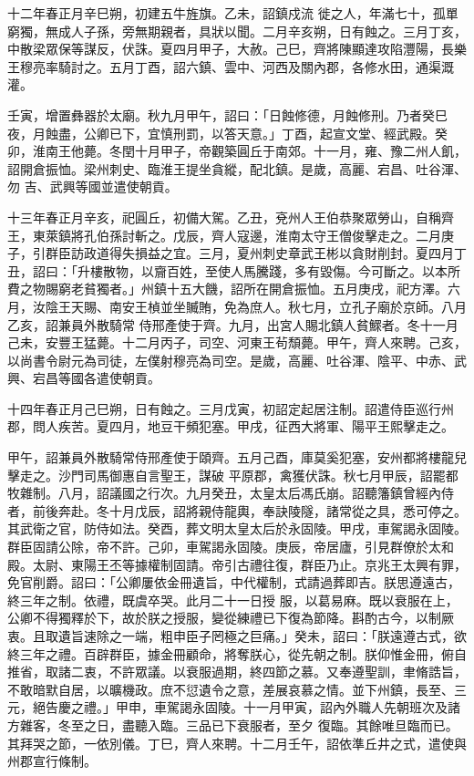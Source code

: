 \begin{pinyinscope}
 十二年春正月辛巳朔，初建五牛旌旗。乙未，詔鎮戍流
 徙之人，年滿七十，孤單窮獨，無成人子孫，旁無期親者，具狀以聞。二月辛亥朔，日有蝕之。三月丁亥，中散梁眾保等謀反，伏誅。夏四月甲子，大赦。己巳，齊將陳顯達攻陷灃陽，長樂王穆亮率騎討之。五月丁酉，詔六鎮、雲中、河西及關內郡，各修水田，通渠溉灌。



 壬寅，增置彝器於太廟。秋九月甲午，詔曰：「日蝕修德，月蝕修刑。乃者癸巳夜，月蝕盡，公卿已下，宜慎刑罰，以答天意。」丁酉，起宣文堂、經武殿。癸卯，淮南王他薨。冬閏十月甲子，帝觀築圓丘于南郊。十一月，雍、豫二州人飢，詔開倉振恤。梁州刺史、臨淮王提坐貪縱，配北鎮。是歲，高麗、宕昌、吐谷渾、勿
 吉、武興等國並遣使朝貢。



 十三年春正月辛亥，祀圓丘，初備大駕。乙丑，兗州人王伯恭聚眾勞山，自稱齊王，東萊鎮將孔伯孫討斬之。戊辰，齊人寇邊，淮南太守王僧俊擊走之。二月庚子，引群臣訪政道得失損益之宜。三月，夏州刺史章武王彬以貪財削封。夏四月丁丑，詔曰：「升樓散物，以齎百姓，至使人馬騰踐，多有毀傷。今可斷之。以本所費之物賜窮老貧獨者。」州鎮十五大饑，詔所在開倉振恤。五月庚戌，祀方澤。六月，汝陰王天賜、南安王楨並坐贓賄，免為庶人。秋七月，立孔子廟於京師。八月乙亥，詔兼員外散騎常
 侍邢產使于齊。九月，出宮人賜北鎮人貧鰥者。冬十一月己未，安豐王猛薨。十二月丙子，司空、河東王茍頹薨。甲午，齊人來聘。己亥，以尚書令尉元為司徒，左僕射穆亮為司空。是歲，高麗、吐谷渾、陰平、中赤、武興、宕昌等國各遣使朝貢。



 十四年春正月己巳朔，日有蝕之。三月戊寅，初詔定起居注制。詔遣侍臣巡行州郡，問人疾苦。夏四月，地豆干頻犯塞。甲戌，征西大將軍、陽平王熙擊走之。



 甲午，詔兼員外散騎常侍邢產使于頤齊。五月己酉，庫莫奚犯塞，安州都將樓龍兒擊走之。沙門司馬御惠自言聖王，謀破
 平原郡，禽獲伏誅。秋七月甲辰，詔罷都牧雜制。八月，詔議國之行次。九月癸丑，太皇太后馮氏崩。詔聽籓鎮曾經內侍者，前後奔赴。冬十月戊辰，詔將親侍龍輿，奉訣陵隧，諸常從之具，悉可停之。其武衛之官，防侍如法。癸酉，葬文明太皇太后於永固陵。甲戌，車駕謁永固陵。群臣固請公除，帝不許。己卯，車駕謁永固陵。庚辰，帝居廬，引見群僚於太和殿。太尉、東陽王丕等據權制固請。帝引古禮往復，群臣乃止。京兆王太興有罪，免官削爵。詔曰：「公卿屢依金冊遺旨，中代權制，式請過葬即吉。朕思遵遠古，終三年之制。依禮，既虞卒哭。此月二十一日授
 服，以葛易麻。既以衰服在上，公卿不得獨釋於下，故於朕之授服，變從練禮已下復為節降。斟酌古今，以制厥衷。且取遺旨速除之一端，粗申臣子罔極之巨痛。」癸未，詔曰：「朕遠遵古式，欲終三年之禮。百辟群臣，據金冊顧命，將奪朕心，從先朝之制。朕仰惟金冊，俯自推省，取諸二衷，不許眾議。以衰服過期，終四節之慕。又奉遵聖訓，聿脩誥旨，不敢暗默自居，以曠機政。庶不愆遺令之意，差展哀慕之情。並下州鎮，長至、三元，絕告慶之禮。」甲申，車駕謁永固陵。十一月甲寅，詔內外職人先朝班次及諸方雜客，冬至之日，盡聽入臨。三品已下衰服者，至夕
 復臨。其餘唯旦臨而已。其拜哭之節，一依別儀。丁巳，齊人來聘。十二月壬午，詔依準丘井之式，遣使與州郡宣行條制。




\end{pinyinscope}
